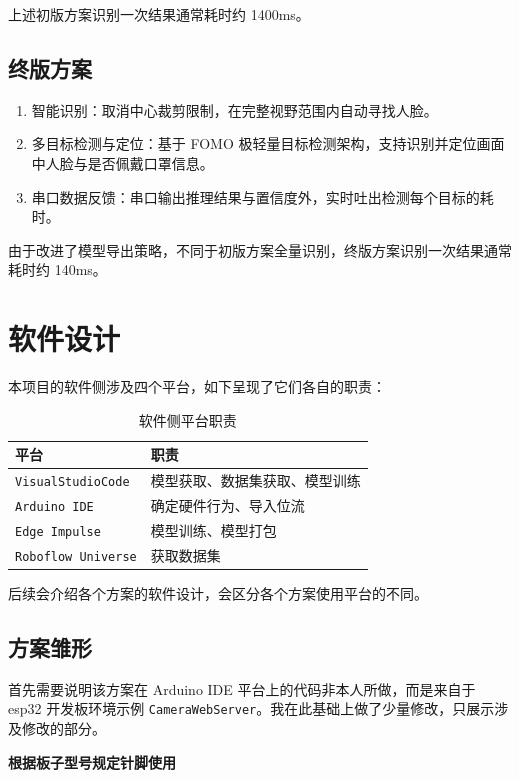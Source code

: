 \documentclass[a4paper,12pt]{ctexart}
\begin{document}
上述初版方案识别一次结果通常耗时约 1400ms。

\subsection{终版方案}

\begin{enumerate}
    \item 智能识别：取消中心裁剪限制，在完整视野范围内自动寻找人脸。
    \item 多目标检测与定位：基于 FOMO 极轻量目标检测架构，支持识别并定位画面中人脸与是否佩戴口罩信息。
    \item 串口数据反馈：串口输出推理结果与置信度外，实时吐出检测每个目标的耗时。
\end{enumerate}

由于改进了模型导出策略，不同于初版方案全量识别，终版方案识别一次结果通常耗时约 140ms。

\section{软件设计}

本项目的软件侧涉及四个平台，如下呈现了它们各自的职责：

\begin{table}[H]
\centering
\caption{软件侧平台职责}
\begin{tabular}{L{4cm} L{9.5cm}}
\toprule
\textbf{平台} & \textbf{职责} \\
\midrule
\texttt{VisualStudioCode} & 模型获取、数据集获取、模型训练 \\
\texttt{Arduino IDE} & 确定硬件行为、导入位流 \\
\texttt{Edge Impulse}  & 模型训练、模型打包 \\
\texttt{Roboflow Universe}   & 获取数据集 \\
\bottomrule
\end{tabular}
\end{table}

后续会介绍各个方案的软件设计，会区分各个方案使用平台的不同。

\subsection{方案雏形}

首先需要说明该方案在 Arduino IDE 平台上的代码非本人所做，而是来自于 esp32 开发板环境示例 \texttt{CameraWebServer}。我在此基础上做了少量修改，只展示涉及修改的部分。

\textbf{根据板子型号规定针脚使用}
\end{document}
